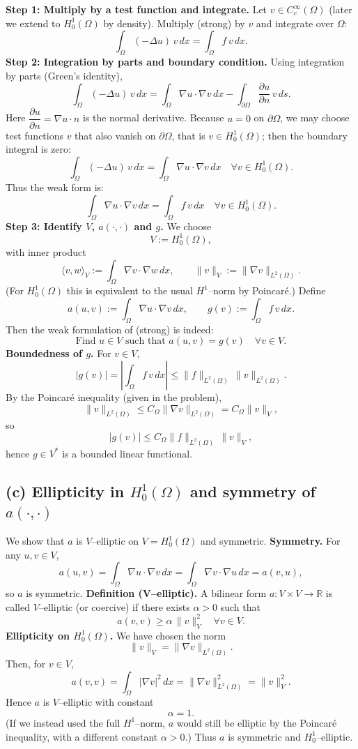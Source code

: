 \textbf{Step 1: Multiply by a test function and integrate.}
Let $v\in C_c^\infty(\Omega)$ (later we extend to $H^1_0(\Omega)$ by density).
Multiply (strong) by $v$ and integrate over $\Omega$:
\[
  \int_\Omega (-\Delta u)\,v\,dx
  = \int_\Omega f\,v\,dx.
\]
\textbf{Step 2: Integration by parts and boundary condition.}
Using integration by parts (Green's identity),
\[
  \int_\Omega (-\Delta u)\,v\,dx
  = \int_\Omega \nabla u\cdot\nabla v\,dx
  - \int_{\partial\Omega} \frac{\partial u}{\partial n}\,v\,ds.
\]
Here $\dfrac{\partial u}{\partial n} = \nabla u\cdot n$ is the normal derivative.
Because $u=0$ on $\partial\Omega$, we may choose test functions $v$ that also
vanish on $\partial\Omega$, that is $v\in H^1_0(\Omega)$; then the boundary integral is zero:
\[
  \int_\Omega (-\Delta u)\,v\,dx
  = \int_\Omega \nabla u\cdot\nabla v\,dx
  \quad\forall v\in H^1_0(\Omega).
\]
Thus the weak form is:
\[
  \int_\Omega \nabla u\cdot\nabla v\,dx
  = \int_\Omega f\,v\,dx
  \quad\forall v\in H^1_0(\Omega).
\]
\textbf{Step 3: Identify $V$, $a(\cdot,\cdot)$ and $g$.}
We choose
\[
  V := H^1_0(\Omega),
\]
with inner product
\[
  \langle v,w\rangle_V := \int_\Omega \nabla v\cdot\nabla w\,dx,
  \qquad
  \|v\|_V := \|\nabla v\|_{L^2(\Omega)}.
\]
(For $H^1_0(\Omega)$ this is equivalent to the usual $H^1$--norm by Poincaré.)
Define
\[
  a(u,v) := \int_\Omega \nabla u\cdot\nabla v\,dx,
  \qquad
  g(v) := \int_\Omega f\,v\,dx.
\]
Then the weak formulation of (strong) is indeed:
\[
  \boxed{
    \text{Find } u\in V \text{ such that }
    a(u,v) = g(v)\quad \forall v\in V.
  }
\]
\textbf{Boundedness of $g$.}
For $v\in V$,
\[
  |g(v)|
  = \left|\int_\Omega f\,v\,dx\right|
  \le \|f\|_{L^2(\Omega)}\,\|v\|_{L^2(\Omega)}.
\]
By the Poincaré inequality (given in the problem),
\[
  \|v\|_{L^2(\Omega)} \le C_\Omega \|\nabla v\|_{L^2(\Omega)} = C_\Omega \|v\|_V,
\]
so
\[
  |g(v)|
  \le C_\Omega \|f\|_{L^2(\Omega)}\,\|v\|_V,
\]
hence $g\in V^\ast$ is a bounded linear functional.
\subsection*{(c) Ellipticity in $H^1_0(\Omega)$ and symmetry of $a(\cdot,\cdot)$}
We show that $a$ is $V$--elliptic on $V=H^1_0(\Omega)$ and symmetric.
\textbf{Symmetry.}
For any $u,v\in V$,
\[
  a(u,v)
  = \int_\Omega \nabla u\cdot\nabla v\,dx
  = \int_\Omega \nabla v\cdot\nabla u\,dx
  = a(v,u),
\]
so $a$ is symmetric.
\textbf{Definition (V--elliptic).}
A bilinear form $a:V\times V\to\mathbb{R}$ is called $V$--elliptic (or coercive) if there
exists $\alpha>0$ such that
\[
  a(v,v) \ge \alpha\,\|v\|_V^2 \quad\forall v\in V.
\]
\textbf{Ellipticity on $H^1_0(\Omega)$.}
We have chosen the norm
\[
  \|v\|_V = \|\nabla v\|_{L^2(\Omega)}.
\]
Then, for $v\in V$,
\[
  a(v,v)
  = \int_\Omega |\nabla v|^2\,dx
  = \|\nabla v\|_{L^2(\Omega)}^2
  = \|v\|_V^2.
\]
Hence $a$ is $V$--elliptic with constant
\[
  \alpha = 1.
\]
(If we instead used the full $H^1$--norm, $a$ would still be elliptic by the Poincaré
inequality, with a different constant $\alpha>0$.)
Thus $a$ is symmetric and $H^1_0$--elliptic.
